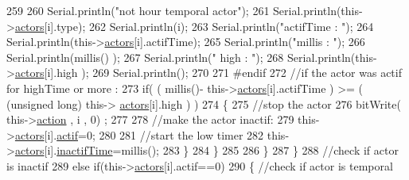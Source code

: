 \begin{DoxyCode}
259                         
260                         Serial.println(\textcolor{stringliteral}{"not hour temporal actor"});
261                         Serial.println(this->\hyperlink{class_jetpack_a7e16d2f97837f9712a2e6de1c50d99db}{actors}[i].type);
262                         Serial.println(i);
263                         Serial.println(\textcolor{stringliteral}{"actifTime : "});
264                         Serial.println(this->\hyperlink{class_jetpack_a7e16d2f97837f9712a2e6de1c50d99db}{actors}[i].actifTime);
265                         Serial.println(\textcolor{stringliteral}{"millis : "});
266                         Serial.println(millis() );
267                         Serial.println(\textcolor{stringliteral}{" high : "});
268                         Serial.println(this->\hyperlink{class_jetpack_a7e16d2f97837f9712a2e6de1c50d99db}{actors}[i].high );
269                         Serial.println();
270                     
271 \textcolor{preprocessor}{                    #endif}
272                         \textcolor{comment}{//if the actor was actif for highTime or more :}
273                         \textcolor{keywordflow}{if}( ( millis()- this->\hyperlink{class_jetpack_a7e16d2f97837f9712a2e6de1c50d99db}{actors}[i].actifTime  ) >= ( (\textcolor{keywordtype}{unsigned} \textcolor{keywordtype}{long}) this->
      \hyperlink{class_jetpack_a7e16d2f97837f9712a2e6de1c50d99db}{actors}[i].high  ) )
274                         \{
275                             \textcolor{comment}{//stop the actor}
276                             bitWrite( this->\hyperlink{class_jetpack_aca3142925a7b0834b34ae91d26af7765}{action} , i , 0) ;
277 
278                             \textcolor{comment}{//make the actor inactif:}
279                             this->\hyperlink{class_jetpack_a7e16d2f97837f9712a2e6de1c50d99db}{actors}[i].\hyperlink{struct_jetpack_1_1state_aa177541689bbaea21a4650a083b0df77}{actif}=0;
280 
281                             \textcolor{comment}{//start the low timer}
282                             this->\hyperlink{class_jetpack_a7e16d2f97837f9712a2e6de1c50d99db}{actors}[i].\hyperlink{struct_jetpack_1_1state_aaf817b1f9e7a4d65b9e3ca4726b281f6}{inactifTime}=millis();              
283                         \}
284                     \}           
285                             
286                 \}
287             \}
288             \textcolor{comment}{//check if actor is inactif}
289             \textcolor{keywordflow}{else} \textcolor{keywordflow}{if}(this->\hyperlink{class_jetpack_a7e16d2f97837f9712a2e6de1c50d99db}{actors}[i].actif==0)
290             \{   \textcolor{comment}{//check if actor is temporal}

\end{DoxyCode}
